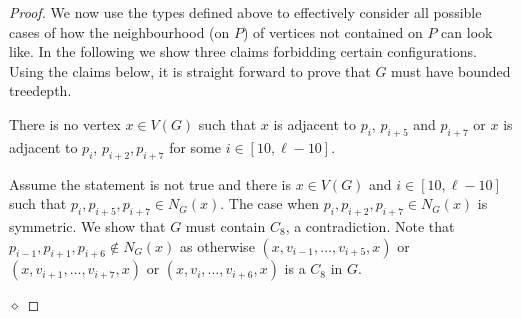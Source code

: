 \documentclass[runningheads,envcountsame]{llncs}
\newenvironment{claimproof}
{\noindent {\em Proof of Claim:} }
{\hfill $\diamond$ \smallskip}
\begin{document}
\begin{proof}
    We now use the types defined above to effectively consider all possible cases of how the neighbourhood (on $P$) of vertices not contained on $P$ can look like. In the following we show three claims forbidding certain configurations. Using the claims below, it is straight forward to prove that $G$ must have bounded treedepth. 
     \begin{mclaim}\label{claim:case057}
         There is no vertex $x\in V(G)$ such that $x$ is adjacent to $p_i$, $p_{i+5}$ and $p_{i+7}$ or $x$ is adjacent to $p_{i}$, $p_{i+2},p_{i+7}$ for some $i\in [10,\ell-10]$.
     \end{mclaim}
     \begin{claimproof}
         Assume the statement is not true and there is $x\in V(G)$ and $i\in [10,\ell-10]$ such that $p_i, p_{i+5},p_{i+7}\in N_G(x)$. The case when $p_i, p_{i+2},p_{i+7}\in N_G(x)$ is symmetric. We show that $G$ must contain $C_8$, a contradiction. 
         Note that  $p_{i-1},p_{i+1},p_{i+6}\notin N_G(x)$ as otherwise $(x,v_{i-1},\dots,v_{i+5},x)$ or $(x,v_{i+1},\dots, v_{i+7},x)$ or $(x, v_i,\dots, v_{i+6},x)$ is a $C_8$ in $G$.


\end{claimproof}
\end{proof}
\end{document}
